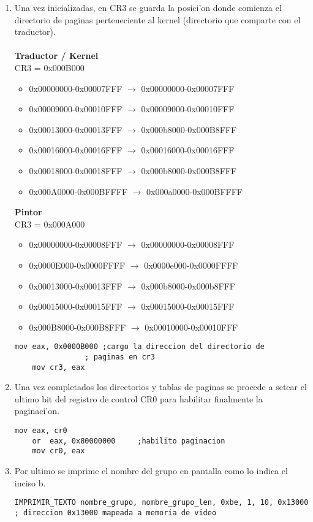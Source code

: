 \documentclass[11pt]{article}
\begin{document}
\begin{enumerate}
\item Una vez inicializadas, en CR3 se guarda la posici'on donde comienza el directorio de paginas perteneciente al kernel (directorio que comparte con el traductor).\\
\\
\textbf{Traductor / Kernel} \\
	CR3 = 0x000B000 \\
\begin{itemize}
\item 0x00000000-0x00007FFF	$\rightarrow$ 0x00000000-0x00007FFF 
\item 0x00009000-0x00010FFF	$\rightarrow$ 0x00009000-0x00010FFF 
\item 0x00013000-0x00013FFF	$\rightarrow$ 0x000b8000-0x000B8FFF 
\item 0x00016000-0x00016FFF	$\rightarrow$ 0x00016000-0x00016FFF 
\item 0x00018000-0x00018FFF	$\rightarrow$ 0x000b8000-0x000B8FFF 
\item 0x000A0000-0x000BFFFF	$\rightarrow$ 0x000a0000-0x000BFFFF 
\end{itemize}
\textbf{Pintor} \\
	CR3 = 0x000A000 \\
\begin{itemize}
\item 0x00000000-0x00008FFF 	$\rightarrow$ 0x00000000-0x00008FFF 
\item 0x0000E000-0x0000FFFF	$\rightarrow$ 0x0000e000-0x0000FFFF 
\item 0x00013000-0x00013FFF	$\rightarrow$ 0x000b8000-0x000b8FFF 
\item 0x00015000-0x00015FFF	$\rightarrow$ 0x00015000-0x00015FFF 
\item 0x000B8000-0x000B8FFF	$\rightarrow$ 0x00010000-0x00010FFF 
\end{itemize}
\begin{lstlisting}[frame=single]
	mov eax, 0x0000B000	;cargo la direccion del directorio de
				; paginas en cr3
	mov cr3, eax
\end{lstlisting}

\item
Una vez completados los directorios y tablas de paginas se procede a setear el ultimo bit del registro de control CR0 para habilitar finalmente la paginaci'on.
\begin{lstlisting}[frame=single]
	mov eax, cr0				
	or  eax, 0x80000000		;habilito paginacion
	mov cr0, eax
\end{lstlisting}

\item
Por ultimo se imprime el nombre del grupo en pantalla como lo indica el inciso b.
\begin{lstlisting}[frame=single]
IMPRIMIR_TEXTO nombre_grupo, nombre_grupo_len, 0xbe, 1, 10, 0x13000
; direccion 0x13000 mapeada a memoria de video
\end{lstlisting}

\end{enumerate}
\end{document}
